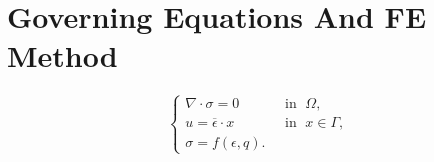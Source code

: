 \section{Governing Equations And FE Method}

\begin{equation}
\left\{
\begin{array}{ll}
	\nabla \cdot \sigma = 0 &\;\text{ in } \;\Omega,\\
	u = \overline{\epsilon} \cdot x &\;\text{ in } \;x \in \Gamma,\\
	\sigma = f(\epsilon,q).
\end{array}
\right.
\label{eq:micro}
\end{equation}
